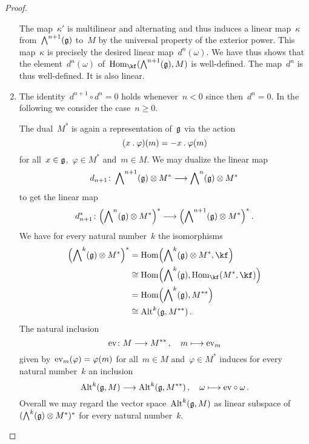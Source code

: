 \begin{proof}
\begin{enumerate}
      The map~$\kappa'$ is multilinear and alternating and thus induces a linear map~$\kappa$ from~$\operatorname{\bigwedge}^{n+1}(\mathfrak{g})$ to~$M$ by the universal property of the exterior power.
      This map~$\kappa$ is precisely the desired linear map~$d^n(\omega)$.
      We have thus shows that the element~$d^n(\omega)$ of~$\Hom_{\kf}( \Exterior^{n+1}(\glie), M)$ is well-defined.
      The map~$d^n$ is thus well-defined.
      It is also linear.
    \item
      The identity~$d^{n+1} \circ d^n = 0$ holds whenever~$n < 0$ since then~$d^n = 0$.
      In the following we consider the case~$n \geq 0$.

      The dual~$M^*$ is again a representation of~$\mathfrak{g}$ via the action
      \[
        (x \mathbin{.} \varphi)(m)
        =
        - x \mathbin{.} \varphi(m)
      \]
      for all~$x \in \mathfrak{g}$,~$\varphi \in M^*$ and~$m \in M$.
      We may dualize the linear map
      \[
        d_{n+1}
        \colon
        \Exterior^{n+1}(\glie) \otimes M^*
        \to
        \Exterior^n(\glie) \otimes M^*
      \]
      to get the linear map
      \[
        d_{n+1}^*
        \colon
        \Bigl( \Exterior^n(\glie) \otimes M^* \Bigr)^*
        \to
        \Bigl( \Exterior^{n+1}(\glie) \otimes M^* \Bigr)^* \,.
      \]
      We have for every natural number~$k$ the isomorphisms
      \begin{align*}
        \Bigl( \Exterior^k(\glie) \otimes M^* \Bigr)^*
        &=
        \Hom\Bigl( \Exterior^k(\glie) \otimes M^*, \kf \Bigr)
        \\
        &\cong
        \Hom\Bigl( \Exterior^k(\glie), \Hom_{\kf}( M^*, \kf ) \Bigr)
        \\
        &=
        \Hom\Bigl( \Exterior^k(\glie), M^{**} \Bigr)
        \\
        &\cong
        \Alt^k( \glie, M^{**} ) \,.
      \end{align*}
      The natural inclusion
      \[
        \ev
        \colon
        M
        \to
        M^{**} \,,
        \quad
        m
        \mapsto
        \ev_m
      \]
      given by~$\operatorname{ev}_m(\varphi) = \varphi(m)$ for all~$m \in M$ and~$\varphi \in M^*$ induces for every natural number~$k$ an inclusion
      \[
        \Alt^k(\glie, M)
        \to
        \Alt^k(\glie, M^{**}) \,,
        \quad
        \omega
        \mapsto
        {\ev} \circ \omega \,.
      \]
      Overall we may regard the vector space~$\operatorname{Alt}^k(\mathfrak{g}, M)$ as linear subspace of~$( \operatorname{\bigwedge}^k(\mathfrak{g}) \otimes M^* )^*$ for every natural number~$k$.


\end{enumerate}
\end{proof}

